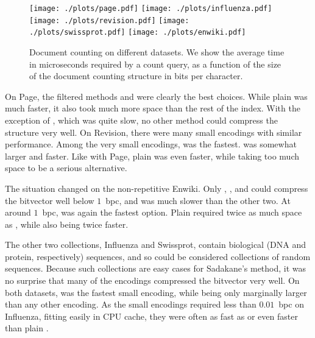 \documentclass[11pt]{llncs}
\newcommand{\doccount}{\textsf{count}}
\newcommand{\Enwiki}{\textsf{Enwiki}}
\newcommand{\Page}{\textsf{Page}}
\newcommand{\Revision}{\textsf{Revision}}
\newcommand{\Influenza}{\textsf{Influenza}}
\newcommand{\Swissprot}{\textsf{Swissprot}}
\begin{document}
\begin{figure}[t]
  \texttt{[image: ./plots/page.pdf]}
\endminipage\hfill
{}
  \texttt{[image: ./plots/influenza.pdf]}
\endminipage
\vspace{1ex}
\newline
{}
  \texttt{[image: ./plots/revision.pdf]}
\endminipage\hfill
{}
  \texttt{[image: ./plots/swissprot.pdf]}
\endminipage
\vspace{1ex}
\newline
{}
  \texttt{[image: ./plots/enwiki.pdf]}
\endminipage\hfill
{}
\endminipage
\vspace{6ex}

\caption{Document counting on different datasets. We show the average time in
microseconds required by a \doccount{} query, as a function of the size of the document counting structure in bits per character.}
\label{figure:results}
\end{figure}

On \Page{}, the filtered methods \SadaPR{} and \SadaRR{} were clearly the best choices. While plain \sada{} was much faster, it also took much more space than the rest of the index. With the exception of \SadaG{}, which was quite slow, no other method could compress the structure very well. On \Revision{}, there were many small encodings with similar performance. Among the very small encodings, \sadaRS{} was the fastest. \sadaSS{} was somewhat larger and faster. Like with \Page{}, plain \sada{} was even faster, while taking too much space to be a serious alternative.

The situation changed on the non-repetitive \Enwiki. Only \sadaDS, \sadaRS,
and \SadaG{} could compress the bitvector well below $1$~bpc, and \SadaG{} was much slower than the other two. At around $1$~bpc, \sadaSS{} was again the fastest option. Plain \sada{} required twice as much space as \sadaSS, while also being twice faster.

The other two collections, \Influenza{} and \Swissprot, contain biological (DNA and protein, respectively) sequences, and so could be considered collections of random sequences. Because such collections are easy cases for Sadakane's method, it was no surprise that many of the encodings compressed the bitvector very well. On both datasets, \sadaSS{} was the fastest small encoding, while being only marginally larger than any other encoding. As the small encodings required less than $0.01$~bpc on \Influenza{}, fitting easily in CPU cache, they were often as fast as or even faster than plain \sada.
\end{document}
